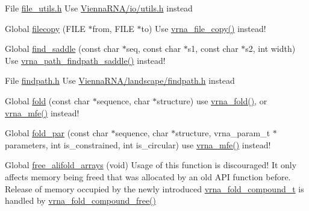 \begin{DoxyRefList}
\item[File \mbox{\hyperlink{file__utils_8h}{file\+\_\+utils.h}} ]\label{deprecated__deprecated000063}%
%
Use \mbox{\hyperlink{io_2utils_8h}{Vienna\+RNA/io/utils.\+h}} instead  
\item[Global \mbox{\hyperlink{utils_2basic_8h_ab213334ce977b6d21611cdea6b80c3bf}{filecopy}} (FILE $\ast$from, FILE $\ast$to)]\label{deprecated__deprecated000192}%
%
Use \mbox{\hyperlink{group__file__utils_ga4382a56d2fee9ed738364b99329edc7c}{vrna\+\_\+file\+\_\+copy()}} instead!  
\item[Global \mbox{\hyperlink{group__paths__deprecated_ga4c0dabf032c04eeab9c7370d15db6ad2}{find\+\_\+saddle}} (const char $\ast$seq, const char $\ast$s1, const char $\ast$s2, int width)]\label{deprecated__deprecated000168}%
%
Use \mbox{\hyperlink{group__paths__direct_gad77dbfa125158f534147c0015a849bc3}{vrna\+\_\+path\+\_\+findpath\+\_\+saddle()}} instead! 
\item[File \mbox{\hyperlink{findpath_8h}{findpath.h}} ]\label{deprecated__deprecated000064}%
%
Use \mbox{\hyperlink{landscape_2findpath_8h}{Vienna\+RNA/landscape/findpath.\+h}} instead  
\item[Global \mbox{\hyperlink{group__mfe__global__deprecated_gaadafcb0f140795ae62e5ca027e335a9b}{fold}} (const char $\ast$sequence, char $\ast$structure)]\label{deprecated__deprecated000066}%
%
use \mbox{\hyperlink{group__mfe__global_ga29a33b2895f4e67b0480271ff289afdc}{vrna\+\_\+fold()}}, or \mbox{\hyperlink{group__mfe__global_gabd3b147371ccf25c577f88bbbaf159fd}{vrna\+\_\+mfe()}} instead! 
\item[Global \mbox{\hyperlink{group__mfe__global__deprecated_ga2bc41df5d71fee6fd8da9904ee65d8fb}{fold\+\_\+par}} (const char $\ast$sequence, char $\ast$structure, vrna\+\_\+param\+\_\+t $\ast$parameters, int is\+\_\+constrained, int is\+\_\+circular)]\label{deprecated__deprecated000065}%
%
use \mbox{\hyperlink{group__mfe__global_gabd3b147371ccf25c577f88bbbaf159fd}{vrna\+\_\+mfe()}} instead! 
\item[Global \mbox{\hyperlink{group__mfe__global__deprecated_ga72095e4554b5d577250ea14c42acc49e}{free\+\_\+alifold\+\_\+arrays}} (void)]\label{deprecated__deprecated000014}%
%
Usage of this function is discouraged! It only affects memory being free\textquotesingle{}d that was allocated by an old API function before. Release of memory occupied by the newly introduced \mbox{\hyperlink{group__fold__compound_ga1b0cef17fd40466cef5968eaeeff6166}{vrna\+\_\+fold\+\_\+compound\+\_\+t}} is handled by \mbox{\hyperlink{group__fold__compound_ga576a077b418a9c3650e06f8e5d296fc2}{vrna\+\_\+fold\+\_\+compound\+\_\+free()}} 

\end{DoxyRefList}
